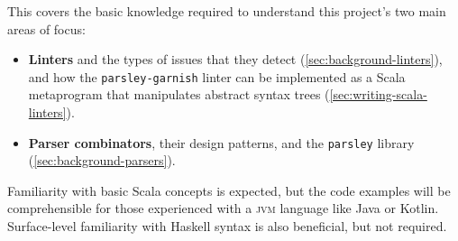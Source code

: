 \documentclass[../../main.tex]{subfiles}
\begin{document}
\label{sec:background}
This  covers the basic knowledge required to understand this project's two main areas of focus:
\begin{itemize}
  \item \textbf{Linters} and the types of issues that they detect (\cref{sec:background-linters}), and how the \texttt{parsley-garnish} linter can be implemented as a Scala metaprogram that manipulates abstract syntax trees (\cref{sec:writing-scala-linters}).
  \item \textbf{Parser combinators}, their design patterns, and the \texttt{parsley} library (\cref{sec:background-parsers}).
\end{itemize}
%
Familiarity with basic Scala concepts is expected, but the code examples will be comprehensible for those experienced with a \textsc{jvm} language like Java or Kotlin.
Surface-level familiarity with Haskell syntax is also beneficial, but not required.

%
%
\end{document}
